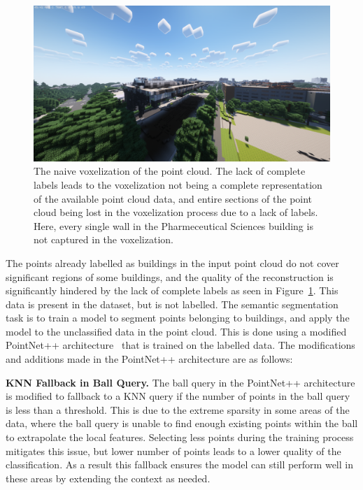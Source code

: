 \documentclass[10pt,twocolumn,letterpaper]{article}
\begin{document}
    \begin{figure}
        \centering
        \includegraphics[width=\linewidth]{naive_voxelization.png}
        \caption{The naive voxelization of the point cloud. The lack of complete labels leads to the voxelization not being a complete representation of the available point cloud data, and entire sections of the point cloud being lost in the voxelization process due to a lack of labels. Here, every single wall in the Pharmeceutical Sciences building is not captured in the voxelization.}
        \label{fig:naive_voxelization}
    \end{figure}

    The points already labelled as buildings in the input point cloud do not cover significant regions of some buildings, and the quality of the reconstruction is significantly hindered by the lack of complete labels as seen in Figure~\ref{fig:naive_voxelization}.
    This data is present in the dataset, but is not labelled.
    The semantic segmentation task is to train a model to segment points belonging to buildings, and apply the model to the unclassified data in the point cloud.
    This is done using a modified PointNet++ architecture~\cite{qi2017pointnet} that is trained on the labelled data.
    The modifications and additions made in the PointNet++ architecture are as follows:

    \textbf{KNN Fallback in Ball Query.} The ball query in the PointNet++ architecture is modified to fallback to a KNN query if the number of points in the ball query is less than a threshold.
    This is due to the extreme sparsity in some areas of the data, where the ball query is unable to find enough existing points within the ball to extrapolate the local features.
    Selecting less points during the training process mitigates this issue, but lower number of points leads to a lower quality of the classification.
    As a result this fallback ensures the model can still perform well in these areas by extending the context as needed.
\end{document}
